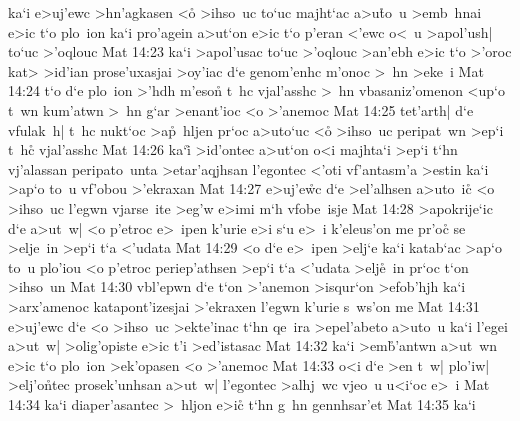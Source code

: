 ka`i
e>uj'ewc
>hn'agkasen
<o\r{}
>ihso~uc
to`uc
majht`ac
a>u\r{t}o~u
>emb~hnai
e>ic
t`o
plo~ion
ka`i
pro'agein
a>ut`on
e>ic
t`o
p'eran
<'ewc
o<~u
>apol'ush|
to`uc
>'oqlouc\bibvsend
\vs Mat 14:23
ka`i
>apol'usac
to`uc
>'oqlouc
>an'ebh
e>ic
t`o
>'oroc
kat>
>id'ian
prose'uxasjai
>oy'iac
d`e
genom'enhc
m'onoc
>~hn
>eke~i\bibvsend
\vs Mat 14:24
t`o
d`e
plo~ion
>'hdh
m'eson\r{}
t~hc
vjal'asshc
>~hn
vbasaniz'omenon
<up`o
t~wn
kum'atwn
>~hn
g`ar
>enant'ioc
<o
>'anemoc\bibvsend
\vs Mat 14:25
tet'arth|
d`e
vfulak~h|
t~hc
nukt`oc
>a\r{p}~hljen
pr`oc
a>uto`uc
<o\r{}
>ihso~uc
peripat~wn
>ep`i
t~hc\r{}
vjal'asshc\bibvsend
\vs Mat 14:26
ka`i\r{}
>id'ontec
a>ut`on
o<i
majhta`i
>ep`i
t`hn
vj'alassan
peripato~unta
>etar'aqjhsan
l'egontec
<'oti
vf'antasm'a
>estin
ka`i
>ap`o
to~u
vf'obou
>'ekraxan\bibvsend
\vs Mat 14:27
e>uj'e\r{w}c
d`e
>el'alhsen
a>uto~ic\r{}
<o
>ihso~uc
l'egwn
vjarse~ite
>eg'w
e>imi
m`h
vfobe~isje\bibvsend
\vs Mat 14:28
>apokrije`ic
d`e
a>ut~w|
<o
p'etroc
e>~ipen
k'urie
e>i
s`u
e>~i
k'eleus'on
me
pr'oc\r{}
se
>elje~in
>ep`i
t`a
<'udata\bibvsend
\vs Mat 14:29
<o
d`e
e>~ipen
>elj`e
ka`i
katab`ac
>ap`o
to~u
plo'iou
<o
p'etroc
periep'athsen
>ep`i
t`a
<'udata
>elj\r{e}~in
pr`oc
t`on
>ihso~un\bibvsend
\vs Mat 14:30
vbl'epwn
d`e
t`on
>'anemon
>isqur`on
>efob'hjh
ka`i
>arx'amenoc
katapont'izesjai
>'ekraxen
l'egwn
k'urie
s~ws'on
me\bibvsend
\vs Mat 14:31
e>uj'ewc
d`e
<o
>ihso~uc
>ekte'inac
t`hn
qe~ira
>epel'abeto
a>uto~u
ka`i
l'egei
a>ut~w|
>olig'opiste
e>ic
t'i
>ed'istasac\bibvsend
\vs Mat 14:32
ka`i
>em\r{b}'antwn
a>ut~wn
e>ic
t`o
plo~ion
>ek'opasen
<o
>'anemoc\bibvsend
\vs Mat 14:33
o<i
d`e
>en
t~w|
plo'iw|
>elj'o\r{n}tec
prosek'unhsan
a>ut~w|
l'egontec
>alhj~wc
vjeo~u
u<i`oc
e>~i\bibvsend
\vs Mat 14:34
ka`i
diaper'asantec
>~hljon
e>ic\r{}
t`hn
g~hn
gennhsar'et\bibvsend
\vs Mat 14:35
ka`i
